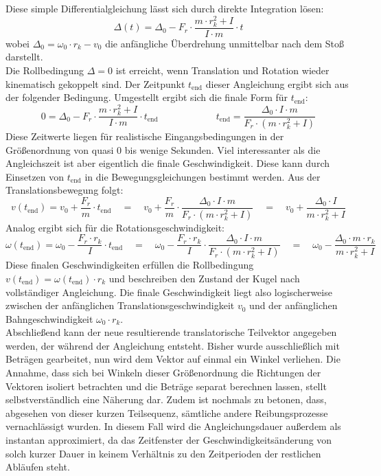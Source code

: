 Diese simple Differentialgleichung lässt sich durch direkte Integration lösen:
\[
\Delta(t) = \Delta_0 - F_r \cdot \frac{m \cdot r_k^2 + I}{I \cdot m} \cdot t
\]
wobei $\Delta_0 = \omega_0 \cdot r_k - v_0$ die anfängliche Überdrehung unmittelbar nach dem Stoß darstellt.
\\
Die Rollbedingung $\Delta = 0$ ist erreicht, wenn Translation und Rotation wieder kinematisch gekoppelt sind. Der Zeitpunkt $t_{\text{end}}$ dieser Angleichung ergibt sich aus der folgender Bedingung. Umgestellt ergibt sich die finale Form für $t_{\text{end}}$:
\[
0 = \Delta_0 - F_r \cdot \frac{m \cdot r_k^2 + I}{I \cdot m} \cdot t_{\text{end}} \qquad  \qquad \qquad t_{\text{end}} = \frac{\Delta_0 \cdot I \cdot m}{F_r \cdot (m \cdot r_k^2 + I)}
\]
Diese Zeitwerte liegen für realistische Eingangsbedingungen in der Größenordnung von quasi 0 bis wenige Sekunden. Viel interessanter als die Angleichszeit ist aber eigentlich die finale Geschwindigkeit. Diese kann durch Einsetzen von $t_{\text{end}}$ in die Bewegungsgleichungen bestimmt werden. Aus der Translationsbewegung folgt:
\[
v(t_{\text{end}}) = v_0 + \frac{F_r}{m} \cdot t_{\text{end}} \quad = \quad  v_0 + \frac{F_r}{m} \cdot \frac{\Delta_0 \cdot I \cdot m}{F_r \cdot (m \cdot r_k^2 + I)} \quad = \quad v_0 + \frac{\Delta_0 \cdot I}{m \cdot r_k^2 + I}
\]
Analog ergibt sich für die Rotationsgeschwindigkeit:
\[
\omega(t_{\text{end}}) = \omega_0 - \frac{F_r \cdot r_k}{I} \cdot t_{\text{end}} \quad = \quad \omega_0 - \frac{F_r \cdot r_k}{I} \cdot \frac{\Delta_0 \cdot I \cdot m}{F_r \cdot (m \cdot r_k^2 + I)} \quad = \quad \omega_0 - \frac{\Delta_0 \cdot m \cdot r_k}{m \cdot r_k^2 + I}
\]
Diese finalen Geschwindigkeiten erfüllen die Rollbedingung $v(t_{\text{end}}) = \omega(t_{\text{end}}) \cdot r_k$ und beschreiben den Zustand der Kugel nach vollständiger Angleichung. Die finale Geschwindigkeit liegt also logischerweise zwischen der anfänglichen Translationsgeschwindigkeit $v_0$ und der anfänglichen Bahngeschwindigkeit $\omega_0 \cdot r_k$.
\\
Abschließend kann der neue resultierende translatorische Teilvektor angegeben werden, der während der Angleichung entsteht. Bisher wurde ausschließlich mit Beträgen gearbeitet, nun wird dem Vektor auf einmal ein Winkel verliehen. Die Annahme, dass sich bei Winkeln dieser Größenordnung die Richtungen der Vektoren isoliert betrachten und die Beträge separat berechnen lassen, stellt selbstverständlich eine Näherung dar. Zudem ist nochmals zu betonen, dass, abgesehen von dieser kurzen Teilsequenz, sämtliche andere Reibungsprozesse vernachlässigt wurden. In diesem Fall wird die Angleichungsdauer außerdem als instantan approximiert, da das Zeitfenster der Geschwindigkeitsänderung von solch kurzer Dauer in keinem Verhältnis zu den Zeitperioden der restlichen Abläufen steht.
